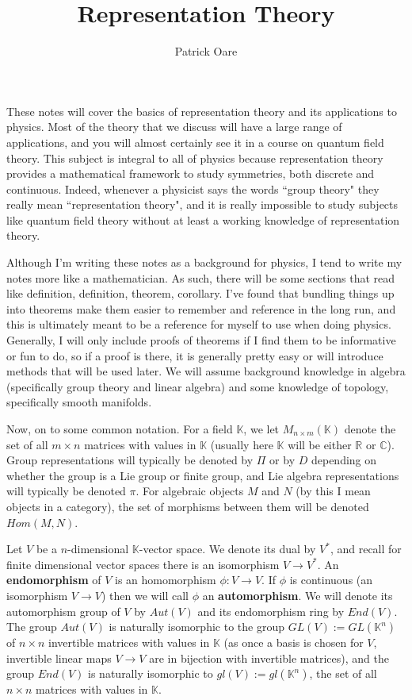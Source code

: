 \documentclass[11pt, oneside]{article}   	%
\title{Representation Theory}
\author{Patrick Oare}
\date{}							%
\theoremstyle{definition}
\begin{document}
\maketitle

These notes will cover the basics of representation theory and its applications to physics. Most of the 
theory that we discuss will have a large range of applications, and you will almost certainly see it in 
a course on quantum field theory. This subject is integral to all of physics because representation 
theory provides a mathematical framework to study symmetries, both discrete and continuous. Indeed, 
whenever a physicist says the words ``group theory" they really mean ``representation theory", and 
it is really impossible to study subjects like quantum field theory without at least a working knowledge 
of representation theory. 

Although I'm writing these notes as a background for physics, I tend to write my notes more like a 
mathematician. As such, there will be some sections that read like definition, definition, theorem, 
corollary. I've found that bundling things up into theorems make them easier to remember and reference 
in the long run, and this is ultimately meant to be a reference for myself to use when doing physics. 
Generally, I will only include proofs of theorems if I find them to be informative or fun to do, so if a 
proof is there, it is generally pretty easy or will introduce methods that will be used later. We will 
assume background knowledge in algebra (specifically group theory and linear algebra) and some 
knowledge of topology, specifically smooth manifolds. 

Now, on to some common notation. For a field $\mathbb K$, we let  $M_{n\times m}(\mathbb K)$ 
denote the set of all $m\times n$ matrices with values in $\mathbb K$ (usually here $\mathbb K$ will 
be either $\mathbb R$ or $\mathbb C$). Group representations will typically be denoted by $\Pi$ or 
by $D$ depending on whether the group is a Lie group or finite group, and Lie algebra representations 
will typically be denoted $\pi$. For algebraic objects $M$ and $N$ (by this I mean objects in a category), 
the set of morphisms between them will be denoted $Hom(M, N)$.

Let $V$ be a $n$-dimensional $\mathbb K$-vector space. We denote its dual by $V^*$, and recall for 
finite dimensional vector spaces there is an isomorphism $V\rightarrow V^*$. An \textbf{endomorphism} 
of $V$ is an homomorphism $\phi : V\rightarrow V$. If $\phi$ is continuous (an isomorphism $V\rightarrow 
V$) then we will call $\phi$ an \textbf{automorphism}. We will denote its automorphism group of $V$ by $Aut(V)$ 
and its endomorphism ring by $End(V)$. The group $Aut(V)$ is naturally isomorphic to the group 
$GL(V) := GL(\mathbb K^n)$ of $n\times n$ invertible matrices with values in $\mathbb K$ (as once 
a basis is chosen for $V$, invertible linear maps $V\rightarrow V$ are in bijection with invertible matrices), 
and the group $End(V)$ is naturally isomorphic to $gl(V) := gl(\mathbb K^n)$, the set of all $n\times n$ 
matrices with values in $\mathbb K$. 
\end{document}
